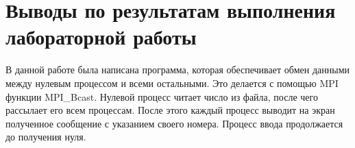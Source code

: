 \documentclass[titlepage,oneside,final,14pt]{extarticle} %
\begin{document}
\section{Выводы по результатам выполнения лабораторной работы}

В данной работе была написана программа, которая обеспечивает обмен данными между нулевым процессом и всеми остальными. Это делается с помощью MPI функции MPI\_Bcast. Нулевой процесс читает число из файла, после чего рассылает его всем процессам. После этого каждый процесс выводит на экран полученное сообщение с указанием своего номера. Процесс ввода продолжается до получения нуля.
\end{document}
